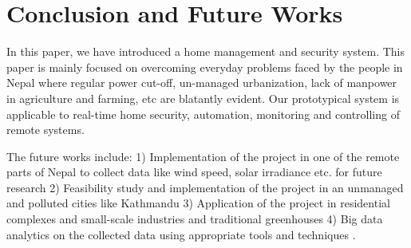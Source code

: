 \documentclass[journal,twoside]{IEEEtran}
\begin{document}
%





\section{Conclusion and Future Works}

In this paper, we have introduced a home management
and security system. This paper is mainly focused on 
overcoming everyday problems faced by the people in
Nepal where regular power cut-off, un-managed
urbanization, lack of manpower in agriculture and
farming, etc are blatantly evident. Our prototypical system
is applicable to real-time home security, automation,
monitoring and controlling of remote systems.

The future works include: 1) Implementation of the project
in one of the remote parts of Nepal to collect data like wind
speed, solar irradiance etc. for future research 2) Feasibility
study and implementation of the project in an unmanaged and
polluted cities like Kathmandu 3) Application of the project in
residential complexes and small-scale industries \cite{Pavithra2015} \cite{Zuehlke2010} and
traditional greenhouses\cite{Dan2015}  4) Big data analytics on the collected
data using appropriate tools and techniques \cite{Signorini2016}.
\end{document}
